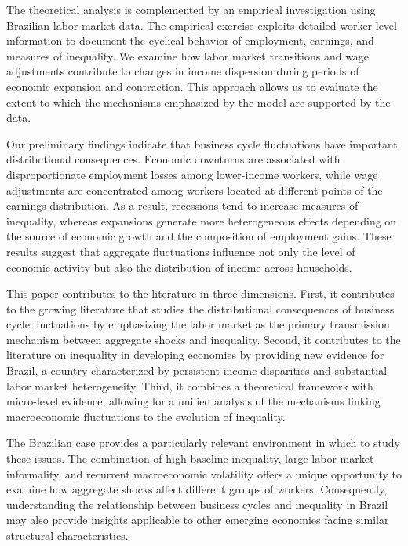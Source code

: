 \documentclass[12pt]{article}
\begin{document}
	The theoretical analysis is complemented by an empirical investigation using Brazilian labor market data. The empirical exercise exploits detailed worker-level information to document the cyclical behavior of employment, earnings, and measures of inequality. We examine how labor market transitions and wage adjustments contribute to changes in income dispersion during periods of economic expansion and contraction. This approach allows us to evaluate the extent to which the mechanisms emphasized by the model are supported by the data.
	
	Our preliminary findings indicate that business cycle fluctuations have important distributional consequences. Economic downturns are associated with disproportionate employment losses among lower-income workers, while wage adjustments are concentrated among workers located at different points of the earnings distribution. As a result, recessions tend to increase measures of inequality, whereas expansions generate more heterogeneous effects depending on the source of economic growth and the composition of employment gains. These results suggest that aggregate fluctuations influence not only the level of economic activity but also the distribution of income across households.
	
	This paper contributes to the literature in three dimensions. First, it contributes to the growing literature that studies the distributional consequences of business cycle fluctuations by emphasizing the labor market as the primary transmission mechanism between aggregate shocks and inequality. Second, it contributes to the literature on inequality in developing economies by providing new evidence for Brazil, a country characterized by persistent income disparities and substantial labor market heterogeneity. Third, it combines a theoretical framework with micro-level evidence, allowing for a unified analysis of the mechanisms linking macroeconomic fluctuations to the evolution of inequality.
	
	The Brazilian case provides a particularly relevant environment in which to study these issues. The combination of high baseline inequality, large labor market informality, and recurrent macroeconomic volatility offers a unique opportunity to examine how aggregate shocks affect different groups of workers. Consequently, understanding the relationship between business cycles and inequality in Brazil may also provide insights applicable to other emerging economies facing similar structural characteristics.
	
\end{document}
